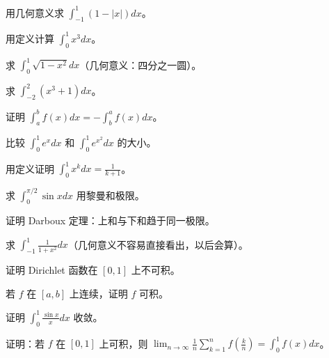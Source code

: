 \begin{exercise}[3] 用几何意义求 \(\int_{-1}^1 (1-|x|) dx\)。\end{exercise}
\begin{exercise}[4] 用定义计算 \(\int_0^1 x^3 dx\)。\end{exercise}
\begin{exercise}[4] 求 \(\int_0^1 \sqrt{1-x^2} dx\)（几何意义：四分之一圆）。\end{exercise}
\begin{exercise}[4] 求 \(\int_{-2}^2 (x^3+1) dx\)。\end{exercise}
\begin{exercise}[4] 证明 \(\int_a^b f(x)dx = -\int_b^a f(x)dx\)。\end{exercise}
\begin{exercise}[4] 比较 \(\int_0^1 e^x dx\) 和 \(\int_0^1 e^{x^2} dx\) 的大小。\end{exercise}
\begin{exercise}[5] 用定义证明 \(\int_0^1 x^k dx = \frac{1}{k+1}\)。\end{exercise}
\begin{exercise}[5] 求 \(\int_0^{\pi/2} \sin x dx\) 用黎曼和极限。\end{exercise}
\begin{exercise}[5] 证明 Darboux 定理：上和与下和趋于同一极限。\end{exercise}
\begin{exercise}[5] 求 \(\int_{-1}^1 \frac{1}{1+x^2} dx\)（几何意义不容易直接看出，以后会算）。\end{exercise}
\begin{exercise}[6] 证明 Dirichlet 函数在 \([0,1]\) 上不可积。\end{exercise}
\begin{exercise}[6] 若 \(f\) 在 \([a,b]\) 上连续，证明 \(f\) 可积。\end{exercise}
\begin{exercise}[6] 证明 \(\int_0^1 \frac{\sin x}{x} dx\) 收敛。\end{exercise}
\begin{exercise}[7] 证明：若 \(f\) 在 \([0,1]\) 上可积，则 \(\lim_{n\to\infty}\frac1n\sum_{k=1}^n f(\frac{k}{n}) = \int_0^1 f(x)dx\)。\end{exercise}
